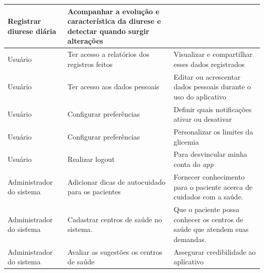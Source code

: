 \begin{table}[htb]
\begin{center}
\begin{tabular}{p{2.0cm}|p{5.0cm}|p{7.0cm}}
            Registrar diurese diária                          &
            Acompanhar a evolução e característica da diurese e detectar quando surgir alterações        \\
            \hline
            Usuário                                           &
            Ter acesso a relatórios dos registros feitos      &
            Visualizar e compartilhar esses dados registrados                                            \\
            \hline
            Usuário                                           &
            Ter acesso aos dados pessoais                     &
            Editar ou acrescentar dados pessoais durante o uso do aplicativo                             \\
            \hline
            Usuário                                           &
            Configurar preferências                           &
            Definir quais notificações ativar ou desativar                                               \\
            \hline
            Usuário                                           &
            Configurar preferências                           &
            Personalizar os limites da glicemia                                                          \\
            \hline
            Usuário                                           &
            Realizar logout                                   &
            Para desvincular minha conta do \emph{app}                                                   \\
            \hline
            Administrador do sistema                          &
            Adicionar dicas de autocuidado para os pacientes  &
            Fornecer conhecimento para o paciente acerca de cuidados com a saúde.                        \\
            \hline
            Administrador do sistema                          &
            Cadastrar centros de saúde no sistema.            &
            Que o paciente possa conhecer os centros de saúde que atendem suas demandas.                 \\
            \hline
            Administrador do sistema                          &
            Avaliar as sugestões os centros de saúde          &
            Assegurar credibilidade ao aplicativo                                                        \\
        \end{tabular}
    \end{center}
\end{table}

